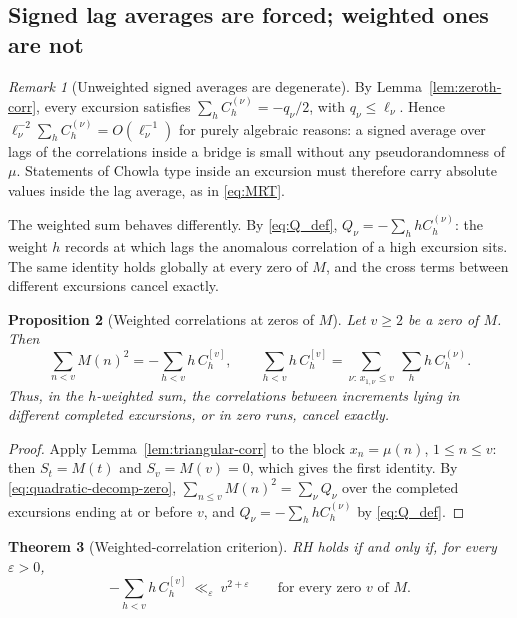 \documentclass[11pt]{amsart}
\numberwithin{equation}{section}
\theoremstyle{plain}
\newtheorem{theorem}{Theorem}[section]
\newtheorem{proposition}[theorem]{Proposition}
\theoremstyle{definition}
\theoremstyle{remark}
\newtheorem{remark}[theorem]{Remark}
\newcommand{\eps}{\varepsilon}
\begin{document}
\subsection{Signed lag averages are forced; weighted ones are not}

\begin{remark}[Unweighted signed averages are degenerate]
\label{rem:chowla-degenerate}
By Lemma~\ref{lem:zeroth-corr}, every excursion satisfies
$\sum_{h}C_h^{(\nu)}=-q_\nu/2$, with $q_\nu\le\ell_\nu$. Hence
$\ell_\nu^{-2}\sum_hC^{(\nu)}_h=O(\ell_\nu^{-1})$ for purely algebraic
reasons: a signed average over lags of the correlations inside a bridge is
small without any pseudorandomness of $\mu$. Statements of Chowla type
inside an excursion must therefore carry absolute values inside the lag
average, as in \eqref{eq:MRT}.
\end{remark}

The weighted sum behaves differently. By \eqref{eq:Q_def},
$Q_\nu=-\sum_hhC_h^{(\nu)}$: the weight $h$ records at which lags the
anomalous correlation of a high excursion sits. The same identity holds
globally at every zero of $M$, and the cross terms between different
excursions cancel exactly.

\begin{proposition}[Weighted correlations at zeros of $M$]
\label{prop:weighted-global}
Let $v\ge2$ be a zero of $M$. Then
\begin{equation}
\label{eq:weighted-global}
\sum_{n<v}M(n)^2=-\sum_{h<v}h\,C^{[v]}_h,
\qquad
\sum_{h<v}h\,C^{[v]}_h=\sum_{\nu:\,x_{1,\nu}\le v}\ \sum_{h}h\,C^{(\nu)}_h .
\end{equation}
Thus, in the $h$-weighted sum, the correlations between increments lying in
different completed excursions, or in zero runs, cancel exactly.
\end{proposition}

\begin{proof}
Apply Lemma~\ref{lem:triangular-corr} to the block $x_n=\mu(n)$,
$1\le n\le v$: then $S_t=M(t)$ and $S_v=M(v)=0$, which gives the first
identity. By \eqref{eq:quadratic-decomp-zero}, $\sum_{n\le v}M(n)^2=\sum_\nu
Q_\nu$ over the completed excursions ending at or before $v$, and
$Q_\nu=-\sum_hhC^{(\nu)}_h$ by \eqref{eq:Q_def}.
\end{proof}

\begin{theorem}[Weighted-correlation criterion]
\label{thm:weighted-corr-RH}
RH holds if and only if, for every $\eps>0$,
\[
-\sum_{h<v}h\,C^{[v]}_h\ \ll_\eps\ v^{2+\eps}
\qquad\text{for every zero $v$ of $M$.}
\]
\end{theorem}
\end{document}
